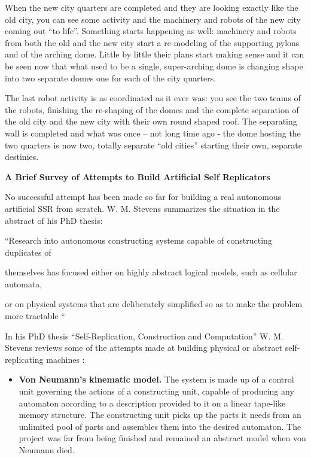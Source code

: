 \documentclass[letterpaper]{article}
\begin{document}
\bigskip

When the new city quarters are completed and they are looking exactly
like the old city, you can see some activity and the machinery and
robots of the new city coming out “to life”. Something starts happening
as well: machinery and robots from both the old and the new city start
a re-modeling of the supporting pylons and of the arching dome. Little
by little their plans start making sense and it can be seen now that
what used to be a single, super-arching dome is changing shape into two
separate domes one for each of the city quarters.


\bigskip

The last robot activity is as coordinated as it ever was: you see the
two teams of the robots, finishing the re-shaping of the domes and the
complete separation of the old city and the new city with their own
round shaped roof. The separating wall is completed and what was once –
not long time ago - the dome hosting the two quarters is now two,
totally separate “old cities” starting their own, separate destinies.


\bigskip

{\bfseries
\hypertarget{RefHeading3152306210128}{}A Brief Survey of Attempts to
Build Artificial Self Replicators}

No successful attempt has been made so far for building a real
autonomous artificial SSR from scratch. W. M. Stevens summarizes the
situation in the abstract of his PhD thesis:


\bigskip

“Research into autonomous constructing systems capable of constructing
duplicates of

themselves has focused either on highly abstract logical models, such as
cellular automata,

or on physical systems that are deliberately simplified so as to make
the problem more tractable “


\bigskip

In his PhD thesis “Self-Replication, Construction and Computation” W. M.
Stevens reviews some of the attempts made at building physical or
abstract self-replicating machines :


\bigskip

\begin{itemize}
\item \textbf{Von Neumann’s kinematic model.} The system is made up of a
control unit governing the actions of a constructing unit, capable of
producing any automaton according to a description provided to it on a
linear tape-like memory structure. The constructing unit picks up the
parts it needs from an unlimited pool of parts and assembles them into
the desired automaton. The project was far from being finished and
remained an abstract model when von Neumann died.
\end{itemize}
\end{document}
